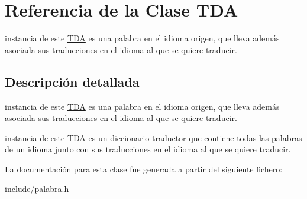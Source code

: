 \hypertarget{classTDA}{\section{\-Referencia de la \-Clase \-T\-D\-A}
\label{classTDA}
}


instancia de este \hyperlink{classTDA}{\-T\-D\-A} es una palabra en el idioma origen, que lleva además asociada sus traducciones en el idioma al que se quiere traducir.  




\subsection{\-Descripción detallada}
instancia de este \hyperlink{classTDA}{\-T\-D\-A} es una palabra en el idioma origen, que lleva además asociada sus traducciones en el idioma al que se quiere traducir. 

instancia de este \hyperlink{classTDA}{\-T\-D\-A} es un diccionario traductor que contiene todas las palabras de un idioma junto con sus traducciones en el idioma al que se quiere traducir. 

\-La documentación para esta clase fue generada a partir del siguiente fichero\-:\begin{DoxyCompactItemize}
\item 
include/palabra.\-h\end{DoxyCompactItemize}
